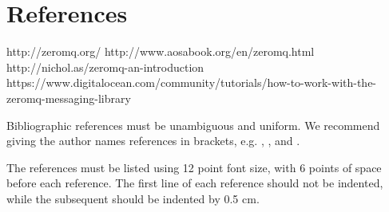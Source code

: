 \documentclass[12pt]{article}
\begin{document}
\section{References}

http://zeromq.org/
http://www.aosabook.org/en/zeromq.html
http://nichol.as/zeromq-an-introduction
https://www.digitalocean.com/community/tutorials/how-to-work-with-the-zeromq-messaging-library


Bibliographic references must be unambiguous and uniform.  We recommend giving
the author names references in brackets, e.g. \cite{knuth:84},
\cite{boulic:91}, and \cite{smith:99}.

The references must be listed using 12 point font size, with 6 points of space
before each reference. The first line of each reference should not be
indented, while the subsequent should be indented by 0.5 cm.



\end{document}
